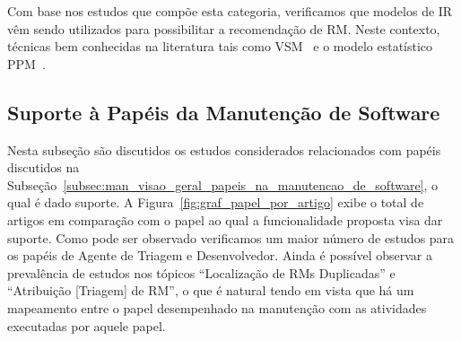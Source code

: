 Com base nos estudos que compõe esta categoria, verificamos que modelos de IR
vêm sendo utilizados para possibilitar a recomendação de RM\@. Neste contexto,
técnicas bem conhecidas na literatura tais como VSM~\cite{Wang2011bug} e o
modelo estatístico PPM~\cite{malheiros2012source}.

\subsection{Suporte à Papéis da Manutenção de Software}
\label{sub:extensões_com_suporte_a_papeis}

Nesta subseção são discutidos os estudos considerados relacionados com papéis
discutidos na
Subseção~\ref{subsec:man_visao_geral_papeis_na_manutencao_de_software}, o qual é
dado suporte. A Figura~\ref{fig:graf_papel_por_artigo} exibe o total de artigos
em comparação com o papel ao qual a funcionalidade proposta visa dar suporte.
Como pode ser observado verificamos um maior número de estudos para os papéis de
Agente de Triagem e Desenvolvedor. Ainda é possível observar a prevalência de
estudos nos tópicos ``Localização de RMs Duplicadas'' e ``Atribuição [Triagem]
de RM'', o que é natural tendo em vista que há um mapeamento entre o papel
desempenhado na manutenção com as atividades executadas por aquele papel.

\begin{table}[htpb]
\centering
{}
\caption{Total de artigos por papel na manutenção de software}
\label{tab:graf_papel_por_artigo}
\end{table}

